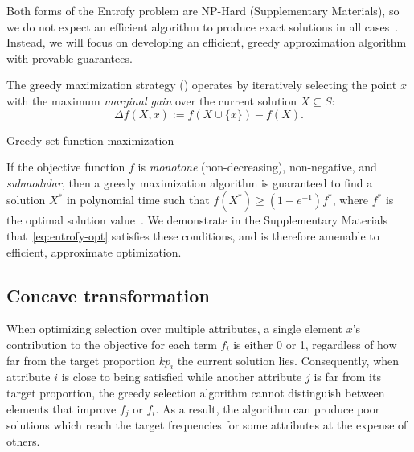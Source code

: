 \documentclass[10pt,letterpaper]{article}
\DeclareMathOperator*{\argmax}{argmax}
\begin{document}
Both forms of the Entrofy problem are NP-Hard (Supplementary Materials), so we do not expect an efficient algorithm to produce exact solutions in all cases~\cite{gary1979computers}.
Instead, we will focus on developing an efficient, greedy approximation algorithm with provable guarantees.

The greedy maximization strategy () operates by iteratively selecting the point $x$ with the maximum \emph{marginal gain} over the current solution $X\subseteq S$:
\begin{equation}
    \Delta f(X, x) := f\left(X \cup \{x\}\right) - f(X).
\end{equation}

\begin{algorithm}[H]
\caption{Greedy set-function maximization}\label{alg:maximize}
\begin{algorithmic}[1]
\State{$X \leftarrow X \cup \left\{\displaystyle\argmax_{x \in S \setminus X} \Delta f(X, x) \right\}$}
\EndWhile{}
\EndProcedure{}
\end{algorithmic}
\end{algorithm}

If the objective function $f$ is \emph{monotone} (non-decreasing), non-negative, and \emph{submodular}, then a greedy maximization algorithm is guaranteed to find a solution $X^*$ in polynomial time such that $f(X^*) \geq (1 - e^{-1}) f^*$, where $f^*$ is the optimal solution value~\cite{fujishige2005submodular}.
We demonstrate in the Supplementary Materials
that~\eqref{eq:entrofy-opt} satisfies these conditions, and is therefore amenable to efficient, approximate optimization.

\subsection*{Concave transformation}
When optimizing selection over multiple attributes, a single element $x$'s contribution to the objective for each term $f_i$ is either 0 or 1, regardless of how far from the target proportion $kp_i$ the current solution lies.
Consequently, when attribute $i$ is close to being satisfied while another attribute $j$ is far from its target proportion, the greedy selection algorithm cannot distinguish between elements that improve $f_j$ or $f_i$.
As a result, the algorithm can produce poor solutions which reach the target frequencies for some attributes at the expense of others.
\end{document}
